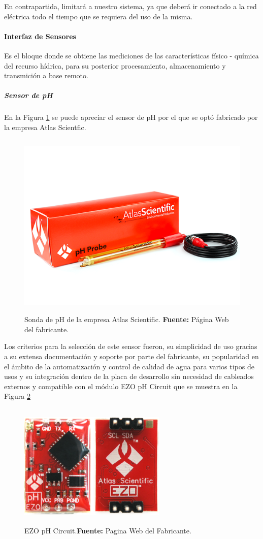 En contrapartida, limitará a nuestro sistema, ya que deberá ir conectado a la red eléctrica todo el tiempo que se requiera del uso de la misma.

\paragraph[Interfaz de Sensores]{Interfaz de Sensores}
Es el bloque donde se obtiene las mediciones de las caracter\'isticas f\'isico - qu\'imica del recurso h\'idrica, para su posterior procesamiento, almacenamiento y transmici\'on a base remoto.

\subparagraph{Sensor de pH}
En la Figura \ref{fig:4.8} se puede apreciar el sensor de pH por el que se optó fabricado por la empresa Atlas Scientfic.
    \begin{figure}[ht]
    \centering
	\includegraphics[width=150mm, height=90mm]{Imagenes/2021/imag23.png}%
	\caption[Sonda de pH de la empresa Atlas Scientific]{Sonda de pH de la empresa Atlas Scientific. \textbf{Fuente:} Página Web del fabricante.}
	\label{fig:4.8}
    \end{figure}
Los criterios para la selección de este sensor fueron, su simplicidad de uso gracias a su extensa documentación y soporte por parte del fabricante, su popularidad en el ámbito de la automatización y control de calidad de agua para varios tipos de usos y su integración dentro de la placa de desarrollo sin necesidad de cableados externos y compatible con el módulo EZO pH Circuit que se muestra en la Figura \ref{fig:4.9}
\newline
\hfill
    \begin{figure}[ht]
    \centering
	\includegraphics[width=70mm, height=60mm]{Imagenes/2021/imag27.png}%
	\caption[EZO pH Circuit]{EZO pH Circuit.\textbf{Fuente:} Pagina Web del Fabricante.}
	\label{fig:4.9}
    \end{figure}
